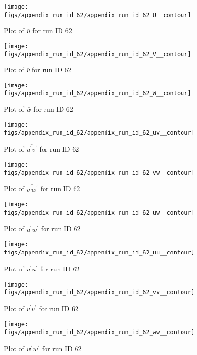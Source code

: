 \begin{figure}[H]
\centering
\texttt{[image: figs/appendix\_run\_id\_62/appendix\_run\_id\_62\_U\_\_contour]}
\caption{Plot of $\overline{u}$ for run ID 62}
\label{fig:appendix_run_id_62_U__contour}
\end{figure}


\begin{figure}[H]
\centering
\texttt{[image: figs/appendix\_run\_id\_62/appendix\_run\_id\_62\_V\_\_contour]}
\caption{Plot of $\overline{v}$ for run ID 62}
\label{fig:appendix_run_id_62_V__contour}
\end{figure}


\begin{figure}[H]
\centering
\texttt{[image: figs/appendix\_run\_id\_62/appendix\_run\_id\_62\_W\_\_contour]}
\caption{Plot of $\overline{w}$ for run ID 62}
\label{fig:appendix_run_id_62_W__contour}
\end{figure}


\begin{figure}[H]
\centering
\texttt{[image: figs/appendix\_run\_id\_62/appendix\_run\_id\_62\_uv\_\_contour]}
\caption{Plot of $\overline{u^\prime v^\prime}$ for run ID 62}
\label{fig:appendix_run_id_62_uv__contour}
\end{figure}


\begin{figure}[H]
\centering
\texttt{[image: figs/appendix\_run\_id\_62/appendix\_run\_id\_62\_vw\_\_contour]}
\caption{Plot of $\overline{v^\prime w^\prime}$ for run ID 62}
\label{fig:appendix_run_id_62_vw__contour}
\end{figure}


\begin{figure}[H]
\centering
\texttt{[image: figs/appendix\_run\_id\_62/appendix\_run\_id\_62\_uw\_\_contour]}
\caption{Plot of $\overline{u^\prime w^\prime}$ for run ID 62}
\label{fig:appendix_run_id_62_uw__contour}
\end{figure}


\begin{figure}[H]
\centering
\texttt{[image: figs/appendix\_run\_id\_62/appendix\_run\_id\_62\_uu\_\_contour]}
\caption{Plot of $\overline{u^\prime u^\prime}$ for run ID 62}
\label{fig:appendix_run_id_62_uu__contour}
\end{figure}


\begin{figure}[H]
\centering
\texttt{[image: figs/appendix\_run\_id\_62/appendix\_run\_id\_62\_vv\_\_contour]}
\caption{Plot of $\overline{v^\prime v^\prime}$ for run ID 62}
\label{fig:appendix_run_id_62_vv__contour}
\end{figure}


\begin{figure}[H]
\centering
\texttt{[image: figs/appendix\_run\_id\_62/appendix\_run\_id\_62\_ww\_\_contour]}
\caption{Plot of $\overline{w^\prime w^\prime}$ for run ID 62}
\label{fig:appendix_run_id_62_ww__contour}
\end{figure}


